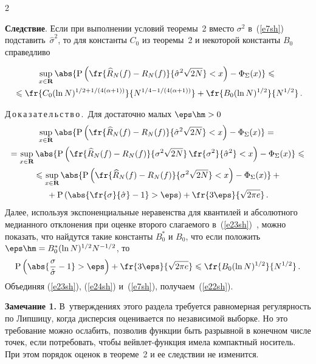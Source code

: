 \begin{multicols}{2}
\medskip

\noindent
\textbf{Следствие}. Если при выполнении условий теоремы~2 
вместо $\sigma^2$ в~(\ref{e7sh}) подставить~$\hat{\sigma}^2$, то для константы $C_0$ из теоремы~2 
и некоторой константы $B_0$ справедливо

\noindent
\begin{multline}
\sup\limits_{x\in\mathbf{R}}\abs{\mbox{P}\left(
\fr{\widehat{R}_N(f)-R_N(f)}{\hat{\sigma}^2\sqrt{2N}}<x\right)-\Phi_\Sigma(x)}\leqslant{}\\
{}\leqslant
\fr{C_0(\ln N)^{{1}/{2}+{1}/(4(\alpha+1))}}{N^{{1}/{4}-{1}/(4(\alpha+1))}}+
\fr{B_0(\ln N)^{{1}/{2}}}{N^{{1}/{2}}}\,.\label{e22sh}
\end{multline}

\medskip

\noindent
Д\,о\,к\,а\,з\,а\,т\,е\,л\,ь\,с\,т\,в\,о\,.\
Для достаточно малых $\eps\hm>0$
\begin{multline}
\sup\limits_{x\in\mathbf{R}}\abs{\mbox{P}\left(
\fr{\widehat{R}_N(f)-R_N(f)}{\hat{\sigma}^2\sqrt{2N}}<x\right)-\Phi_\Sigma(x)}={}\\
{}=
\sup\limits_{x\in\mathbf{R}}\abs{\mbox{P}\left(
\fr{\widehat{R}_N(f)-R_N(f)}{\sigma^{2}\sqrt{2N}}\,
\fr{\sigma^{2}}{\hat{\sigma}^2}<x\right)-\Phi_\Sigma(x)}\leqslant{}\\
{}\leqslant\sup\limits_{x\in\mathbf{R}}\abs{\mbox{P}\left(
\fr{\widehat{R}_N(f)-R_N(f)}{\sigma^{2}\sqrt{2N}}<x\right)-
\Phi_\Sigma(x)}+{}\\
{}+\mbox{P}\left(\abs{\fr{\sigma}{\hat{\sigma}}-1}>\eps\right)+
\fr{3\eps}{\sqrt{2\pi e}}\,.\label{e23sh}
\end{multline}
Далее, используя экспоненциальные неравенства для квантилей и абсолютного 
медианного отклонения при оценке второго слагаемого в~(\ref{e23sh})~\cite{12sh, 17sh}, 
можно показать, что найдутся такие константы $B^{*}_0$ и $B_0$, что если положить 
$\eps\hm=B^{*}_0(\ln N)^{{1}/{2}}N^{-{1}/{2}}$, то
\begin{equation}
\mbox{P}\left(\abs{\frac{\sigma}{\hat{\sigma}}-1}>\eps\right)+
\fr{3\eps}{\sqrt{2\pi e}}\leqslant\fr{B_0(\ln N)^{{1}/{2}}}{N^{{1}/{2}}}\,.\label{e24sh}
\end{equation}
Объединяя (\ref{e23sh}), (\ref{e24sh}) и~(\ref{e7sh}), получаем~(\ref{e22sh}).

\medskip

\noindent
\textbf{Замечание 1.} В~утверждениях этого раздела требуется равномерная 
регулярность по Липшицу, когда дисперсия оценивается по независимой выборке. 
Но это требование можно ослабить, позволив функции быть разрывной в конечном 
числе точек, если потребовать, чтобы вейвлет-функция имела компактный носитель. 
При этом порядок оценок в теореме~2 и ее следствии не изменится.


\end{multicols}
